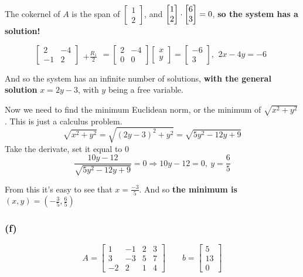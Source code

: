 \documentclass[10pt,letterpaper]{article}
\begin{document}
	The cokernel of $A$ is the span of $\begin{bmatrix}
	1 \\ 2
	\end{bmatrix}$, and $\begin{bmatrix}
	1 \\ 2 
	\end{bmatrix} \cdot \begin{bmatrix}
	\-6 \\ 3
	\end{bmatrix} = 0$, \textbf{so the system has a solution! }
	
	$$
	\begin{bmatrix}
	2 & -4 \\ -1 & 2
	\end{bmatrix} \begin{array}{c}
	\\ +\frac{R_1}{2}
	\end{array} = \begin{bmatrix}
	2 & -4 \\ 0 & 0 
	\end{bmatrix} \begin{bmatrix}
	x \\ y
	\end{bmatrix} = \begin{bmatrix}
	-6 \\ 3
	\end{bmatrix}, \begin{array}{c}
	2x - 4y = -6
	\end{array}
	$$
	
	And so the system has an infinite number of solutions, \textbf{with the general solution} $x = 2y -3$, with $y$ being a free variable. 
	
	Now we need to find the minimum Euclidean norm, or the minimum of $\sqrt{x^2 + y^2}$. This is just a calculus problem. 
	$$
	\sqrt{x^2 + y^2} = \sqrt{(2y -3 )^2 + y^2} = \sqrt{5y^2 -12y + 9}
	$$
	Take the derivate, set it equal to 0
	$$
	\frac{10y - 12}{\sqrt{5y^2 -12y + 9}} = 0 \Rightarrow 10y - 12 = 0, \: y = \frac{6}{5}
	$$
	
	From this it's easy to see that $x = \frac{-3}{5}$. And so \textbf{the minimum is } $\boxed{(x,y) = (-\frac{3}{5}, \frac{6}{5})}$
	\subsubsection*{(f)}
	$$
	A = \begin{bmatrix}
	1 & -1 & 2 & 3 \\ 3 & -3 & 5 & 7 \\ -2 & 2 & 1 & 4
	\end{bmatrix} \qquad b = \begin{bmatrix}
	5 \\ 13 \\ 0
	\end{bmatrix}
	$$
\end{document}
